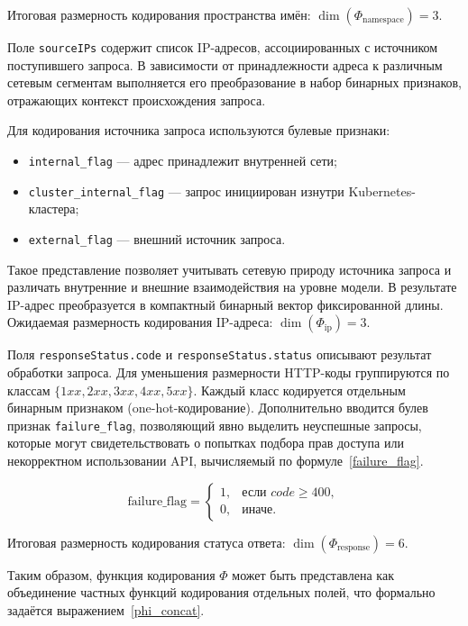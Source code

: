 Итоговая размерность кодирования пространства имён: $\dim(\Phi_{\text{namespace}})=3$.

Поле \texttt{sourceIPs} содержит список IP-адресов, ассоциированных с источником поступившего запроса. В зависимости от принадлежности адреса к различным сетевым сегментам выполняется его преобразование в набор бинарных признаков, отражающих контекст происхождения запроса.

Для кодирования источника запроса используются булевые признаки:

\begin{itemize}
    \item \texttt{internal\_flag} — адрес принадлежит внутренней сети;
    \item \texttt{cluster\_internal\_flag} — запрос инициирован изнутри Kubernetes-кластера;
    \item \texttt{external\_flag} — внешний источник запроса.
\end{itemize}

Такое представление позволяет учитывать сетевую природу источника запроса и различать внутренние и внешние взаимодействия на уровне модели. В результате IP-адрес преобразуется в компактный бинарный вектор фиксированной длины. Ожидаемая размерность кодирования IP-адреса: $\dim(\Phi_{\text{ip}})=3$.

Поля \texttt{responseStatus.code} и \texttt{responseStatus.status} описывают результат обработки запроса. Для уменьшения размерности HTTP-коды группируются по классам $\{1xx,2xx,3xx,4xx,5xx\}$. Каждый класс кодируется отдельным бинарным признаком (one-hot-кодирование). Дополнительно вводится булев признак \texttt{failure\_flag}, позволяющий явно выделить неуспешные запросы, которые могут свидетельствовать о попытках подбора прав доступа или некорректном использовании API, вычисляемый по формуле~\eqref{failure_flag}.

\begin{equation}\label{failure_flag}
    \mathrm{failure\_flag} =
    \begin{cases}
    1, & \text{если } code \ge 400,\\
    0, & \text{иначе}.
    \end{cases}
\end{equation}

Итоговая размерность кодирования статуса ответа: \(\dim(\Phi_{\text{response}})=6\).

Таким образом, функция кодирования $\Phi$ может быть представлена как объединение частных функций кодирования отдельных полей, что формально задаётся выражением~\eqref{phi_concat}.

